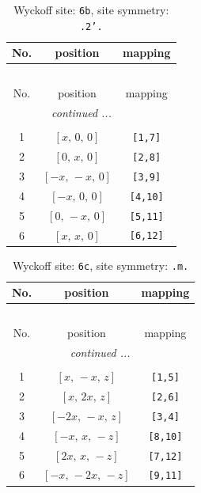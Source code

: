 \documentclass[fleqn,8pt]{jsarticle}
\begin{document}
\begin{longtable}{ccc}
\caption{Wyckoff site: {\tt 6b}, site symmetry: {\tt .2'.}}
 \\
 \hline \hline
No. & position & mapping \\ \hline \endfirsthead

\multicolumn{2}{l}{\tablename\ \thetable{}} \\
 \hline \hline
No. & position & mapping \\ \hline \endhead

 \hline \hline
\multicolumn{2}{r}{\footnotesize\it continued ...} \\ \endfoot

 \hline \hline
\multicolumn{2}{r}{} \\ \endlastfoot

1 & $\left[ x,\, 0,\, 0 \right]$ & {\tt [1,7]} \\ \hline
2 & $\left[ 0,\, x,\, 0 \right]$ & {\tt [2,8]} \\ \hline
3 & $\left[ - x,\, - x,\, 0 \right]$ & {\tt [3,9]} \\ \hline
4 & $\left[ - x,\, 0,\, 0 \right]$ & {\tt [4,10]} \\ \hline
5 & $\left[ 0,\, - x,\, 0 \right]$ & {\tt [5,11]} \\ \hline
6 & $\left[ x,\, x,\, 0 \right]$ & {\tt [6,12]} \\
\end{longtable}
\renewcommand{\arraystretch}{1.2}
\begin{longtable}{ccc}
\caption{Wyckoff site: {\tt 6c}, site symmetry: {\tt .m.}}
 \\
 \hline \hline
No. & position & mapping \\ \hline \endfirsthead

\multicolumn{2}{l}{\tablename\ \thetable{}} \\
 \hline \hline
No. & position & mapping \\ \hline \endhead

 \hline \hline
\multicolumn{2}{r}{\footnotesize\it continued ...} \\ \endfoot

 \hline \hline
\multicolumn{2}{r}{} \\ \endlastfoot

1 & $\left[ x,\, - x,\, z \right]$ & {\tt [1,5]} \\ \hline
2 & $\left[ x,\, 2 x,\, z \right]$ & {\tt [2,6]} \\ \hline
3 & $\left[ - 2 x,\, - x,\, z \right]$ & {\tt [3,4]} \\ \hline
4 & $\left[ - x,\, x,\, - z \right]$ & {\tt [8,10]} \\ \hline
5 & $\left[ 2 x,\, x,\, - z \right]$ & {\tt [7,12]} \\ \hline
6 & $\left[ - x,\, - 2 x,\, - z \right]$ & {\tt [9,11]} \\
\end{longtable}
\end{document}
